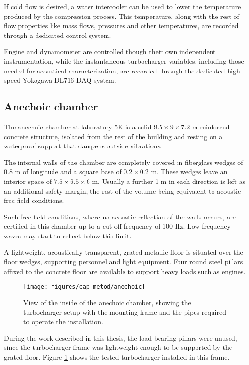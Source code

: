 If cold flow is desired, a water intercooler can be used to lower the temperature produced by the compression process. This temperature, along with the rest of flow properties like mass flows, pressures and other temperatures, are recorded through a dedicated control system.

Engine and dynamometer are controlled though their own independent instrumentation, while the instantaneous turbocharger variables, including those needed for acoustical characterization, are recorded through the dedicated high speed Yokogawa DL716 DAQ system.

\subsection{Anechoic chamber} \label{sub:anec_chamber}

The anechoic chamber at laboratory 5K is a solid $9.5 \times 9 \times 7.2$ m reinforced concrete structure, isolated from the rest of the building and resting on a waterproof support that dampens outside vibrations.

The internal walls of the chamber are completely covered in fiberglass wedges of 0.8 m of longitude and a square base of $0.2 \times 0.2$ m. These wedges leave an interior space of $7.5 \times 6.5 \times 6$ m. Usually a further 1 m in each direction is left as an additional safety margin, the rest of the volume being equivalent to acoustic free field conditions.

Such free field conditions, where no acoustic reflection of the walls occurs, are certified in this chamber up to a cut-off frequency of 100 Hz. Low frequency waves may start to reflect below this limit.

A lightweight, acoustically-transparent, grated metallic floor is situated over the floor wedges, supporting personnel and light equipment. Four round steel pillars affixed to the concrete floor are available to support heavy loads such as engines.

\begin{figure}[t!]
\centering
\texttt{[image: figures/cap\_metod/anechoic]}
\caption[View of the anechoic chamber with the turbocharger setup]{View of the inside of the anechoic chamber, showing the turbocharger setup with the mounting frame and the pipes required to operate the installation.}
\label{fig:anechoic_chamber}
\end{figure}

During the work described in this thesis, the load-bearing pillars were unused, since the turbocharger frame was lightweight enough to be supported by the grated floor. Figure \ref{fig:anechoic_chamber} shows the tested turbocharger installed in this frame.

